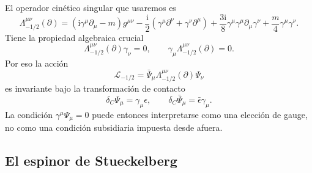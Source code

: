 \documentclass[11pt,a4paper]{article}
\numberwithin{equation}{section}
\newcommand{\Lcal}{\mathcal L}
\newcommand{\sdel}{\gamma^\mu\partial_\mu}
\newcommand{\ii}{\mathrm i}
\begin{document}
El operador cinético singular que usaremos es
\begin{equation}
\label{eq:Lambda-minus-half}
\Lambda^{\mu\nu}_{-1/2}(\partial)
=
(\ii\sdel-m)g^{\mu\nu}
-\frac{\ii}{2}\left(\gamma^\mu\partial^\nu+\gamma^\nu\partial^\mu\right)
+\frac{3\ii}{8}\gamma^\mu\sdel\gamma^\nu
+\frac{m}{4}\gamma^\mu\gamma^\nu.
\end{equation}
Tiene la propiedad algebraica crucial
\begin{equation}
\label{eq:Lambda-gamma-null}
\Lambda^{\mu\nu}_{-1/2}(\partial)\gamma_\nu=0,
\qquad
\gamma_\mu\Lambda^{\mu\nu}_{-1/2}(\partial)=0.
\end{equation}
Por eso la acción
\begin{equation}
\Lcal_{-1/2}=\bar\Psi_\mu\Lambda^{\mu\nu}_{-1/2}(\partial)\Psi_\nu
\end{equation}
es invariante bajo la transformación de contacto
\begin{equation}
\label{eq:contact-free}
\delta_C\Psi_\mu=\gamma_\mu\epsilon,
\qquad
\delta_C\bar\Psi_\mu=\bar\epsilon\gamma_\mu.
\end{equation}
La condición $\gamma^\mu\Psi_\mu=0$ puede entonces interpretarse como una elección de gauge, no como una condición subsidiaria impuesta desde afuera.

\subsection{El espinor de Stueckelberg}
\label{subsec:el-espinor-de-stueckelberg}
\end{document}
